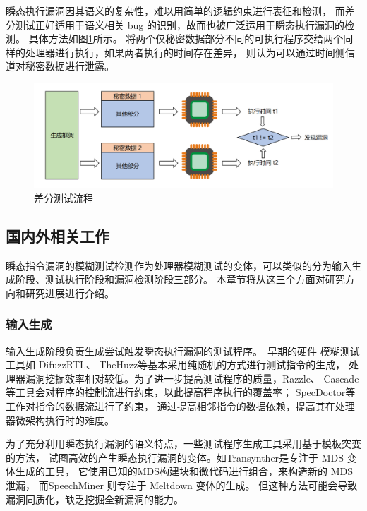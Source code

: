 瞬态执行漏洞因其语义的复杂性，难以用简单的逻辑约束进行表征和检测，
而差分测试正好适用于语义相关 bug 的识别，故而也被广泛运用于瞬态执行漏洞的检测。
具体方法如图\ref{paper:differential-test}所示。
将两个仅秘密数据部分不同的可执行程序交给两个同样的处理器进行执行，如果两者执行的时间存在差异，
则认为可以通过时间侧信道对秘密数据进行泄露。\par

\begin{figure}[!h]
    \centering
    \includegraphics[width=\linewidth]{figure/paper/differential-test.png}
    \caption{差分测试流程}
    \label{paper:differential-test}
\end{figure}

\subsection{国内外相关工作}

瞬态指令漏洞的模糊测试检测作为处理器模糊测试的变体，可以类似的分为输入生成阶段、测试执行阶段和漏洞检测阶段三部分。
本章节将从这三个方面对研究方向和研究进展进行介绍。

\subsubsection{输入生成}
输入生成阶段负责生成尝试触发瞬态执行漏洞的测试程序。\
早期的硬件 模糊测试 工具如 DifuzzRTL\cite{hur2021difuzzrtl}、
TheHuzz\cite{kande2022thehuzz}等基本采用纯随机的方式进行测试指令的生成，
处理器漏洞挖掘效率相对较低。为了进一步提高测试程序的质量，Razzle\cite{razzle}、
Cascade\cite{soltcascade}等工具会对程序的控制流进行约束，以此提高程序执行的覆盖率；
SpecDoctor\cite{hur2022specdoctor}等工作对指令的数据流进行了约束，
通过提高相邻指令的数据依赖，提高其在处理器微架构执行时的难度。\par

为了充分利用瞬态执行漏洞的语义特点，一些测试程序生成工具采用基于模板突变的方法，
试图高效的产生瞬态执行漏洞的变体。如Transynther\cite{moghimi2020medusa}是专注于 MDS 变体生成的工具，
它使用已知的MDS构建块和微代码进行组合，来构造新的 MDS 泄漏，
而SpeechMiner \cite{xiao2019speechminer}则专注于 Meltdown 变体的生成。
但这种方法可能会导致漏洞同质化，缺乏挖掘全新漏洞的能力。\par

